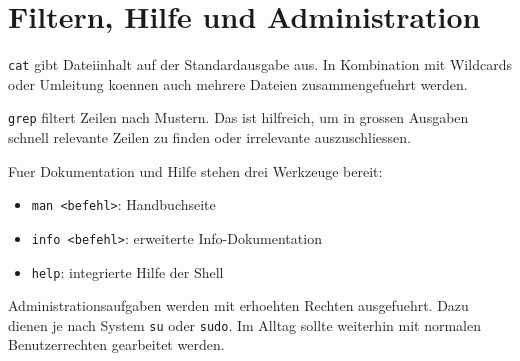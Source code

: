 \documentclass[11pt, oneside, numbers=noenddot]{scrbook}
\begin{document}
\section{Filtern, Hilfe und Administration}
\texttt{cat} gibt Dateiinhalt auf der Standardausgabe aus. In Kombination mit Wildcards oder Umleitung koennen auch mehrere Dateien zusammengefuehrt werden.

\texttt{grep} filtert Zeilen nach Mustern. Das ist hilfreich, um in grossen Ausgaben schnell relevante Zeilen zu finden oder irrelevante auszuschliessen.

Fuer Dokumentation und Hilfe stehen drei Werkzeuge bereit:
\begin{itemize}
\item \texttt{man <befehl>}: Handbuchseite
\item \texttt{info <befehl>}: erweiterte Info-Dokumentation
\item \texttt{help}: integrierte Hilfe der Shell
\end{itemize}

Administrationsaufgaben werden mit erhoehten Rechten ausgefuehrt. Dazu dienen je nach System \texttt{su} oder \texttt{sudo}. Im Alltag sollte weiterhin mit normalen Benutzerrechten gearbeitet werden.
\end{document}
